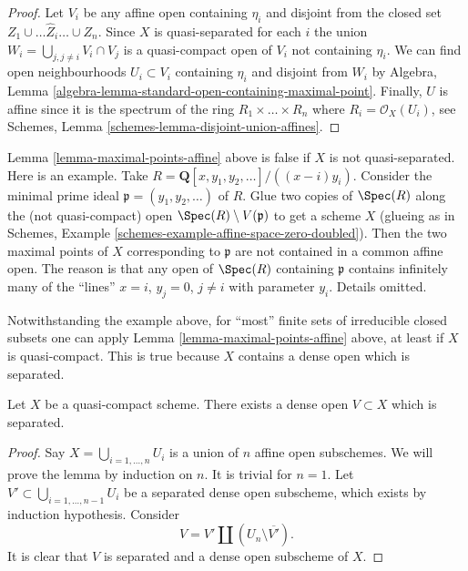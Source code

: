 \begin{proof}
Let $V_i$ be any affine open containing $\eta_i$
and disjoint from the closed set $Z_1 \cup \ldots \hat Z_i \ldots \cup Z_n$.
Since $X$ is quasi-separated for each $i$ the union
$W_i = \bigcup_{j, j \not = i} V_i \cap V_j$ is a quasi-compact
open of $V_i$ not containing $\eta_i$.
We can find open neighbourhoods $U_i \subset V_i$
containing $\eta_i$ and disjoint from $W_i$ by
Algebra, Lemma \ref{algebra-lemma-standard-open-containing-maximal-point}.
Finally, $U$ is affine since it is the spectrum of
the ring $R_1 \times \ldots \times R_n$ where $R_i = \mathcal{O}_X(U_i)$,
see Schemes, Lemma \ref{schemes-lemma-disjoint-union-affines}.
\end{proof}

\begin{remark}
\label{remark-maximal-points-affine}
Lemma \ref{lemma-maximal-points-affine} above is false if $X$
is not quasi-separated. Here is an example. Take
$R = \mathbf{Q}[x, y_1, y_2, \ldots]/((x-i)y_i)$.
Consider the minimal prime ideal $\mathfrak p = (y_1, y_2, \ldots)$
of $R$. Glue two copies of $\Spec(R)$ along the
(not quasi-compact) open $\Spec(R) \setminus V(\mathfrak p)$
to get a scheme $X$ (glueing as in
Schemes, Example \ref{schemes-example-affine-space-zero-doubled}).
Then the two maximal points of $X$ corresponding to $\mathfrak p$
are not contained in a common affine open. The reason is
that any open of $\Spec(R)$ containing $\mathfrak p$
contains infinitely many of the ``lines'' $x = i$, $y_j = 0$,
$j \not = i$ with parameter $y_i$. Details omitted.
\end{remark}

\noindent
Notwithstanding the example above, for ``most'' finite sets of irreducible
closed subsets one can apply Lemma \ref{lemma-maximal-points-affine} above,
at least if $X$ is quasi-compact. This is true because $X$ contains a dense
open which is separated.

\begin{lemma}
\label{lemma-quasi-compact-dense-open-separated}
Let $X$ be a quasi-compact scheme.
There exists a dense open $V \subset X$ which is separated.
\end{lemma}

\begin{proof}
Say $X = \bigcup_{i = 1, \ldots, n} U_i$ is a union of $n$ affine open
subschemes. We will prove the lemma by induction on $n$. It is trivial for
$n = 1$. Let $V' \subset \bigcup_{i = 1, \ldots, n - 1} U_i$ be a separated
dense open subscheme, which exists by induction hypothesis. Consider
$$
V = V' \coprod (U_n \setminus \overline{V'}).
$$
It is clear that $V$ is separated and a dense open subscheme of $X$.
\end{proof}

